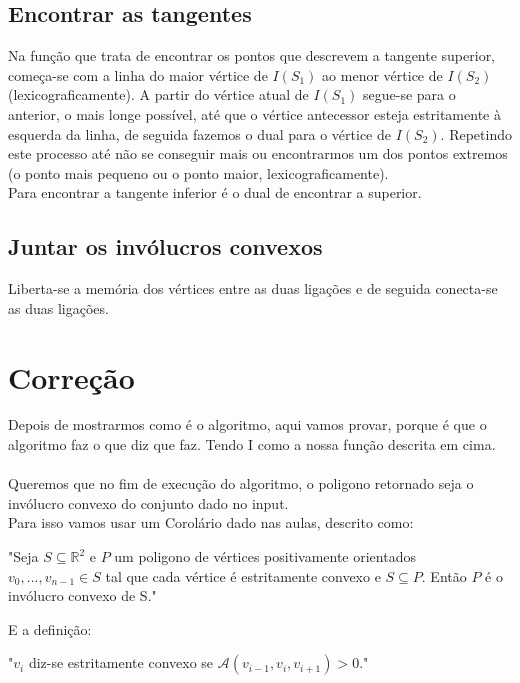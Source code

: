 \documentclass[11pt]{article}
\begin{document}
\subsection{ Encontrar as tangentes } \label{tangentes}
Na função que trata de encontrar os pontos que 
descrevem a tangente superior, começa-se com a linha
do maior vértice de $I(S_1)$ ao menor vértice de $I(S_2)$ (lexicograficamente).
A partir do vértice atual de $I(S_1)$ segue-se para o anterior, o mais 
longe possível, até que o vértice antecessor esteja estritamente à
esquerda da linha, de seguida fazemos o dual para o vértice de $I(S_2)$.
Repetindo este processo até não se conseguir mais ou encontrarmos
um dos pontos extremos (o ponto mais pequeno ou o ponto maior,
lexicograficamente).\\

Para encontrar a tangente inferior é o dual de encontrar
a superior.

\subsection{ Juntar os invólucros convexos } 
Liberta-se a memória dos vértices entre as duas ligações e de seguida 
conecta-se as duas ligações.


\section{Correção}
Depois de mostrarmos como é o algoritmo,
aqui vamos provar, porque é que o algoritmo faz o que diz que faz.
Tendo I como a nossa função descrita em cima.\\
\\
Queremos que no fim de execução do algoritmo, o poligono
retornado seja o invólucro convexo do conjunto dado 
no input.\\
Para isso vamos usar um Corolário dado nas aulas, descrito como:

\begin{center}
    "Seja $S \subseteq \mathbb{R}^2$ e $P$ um poligono de vértices 
    positivamente orientados $v_0,...,v_{n-1} \in S$ tal que cada
    vértice é estritamente convexo e $S \subseteq P$. Então $P$ é
    o invólucro convexo de S."
\end{center}
E a definição:

\begin{center}
    "$v_i$ diz-se estritamente convexo se $\mathcal{A}(v_{i-1},v_i,v_{i+1}) > 0$."
\end{center}
\end{document}
